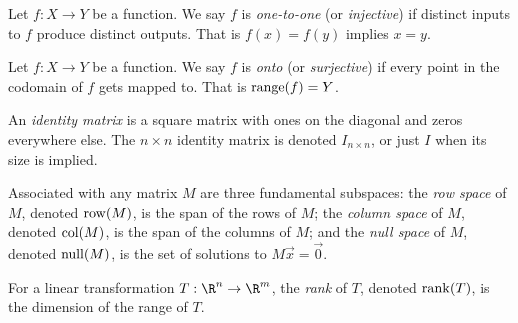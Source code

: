 \begin{SaveDefinition}[
	key=Onetoone,
	title={One-to-one}]
		
	Let $f:X\to Y$ be a function. We say $f$ is \emph{one-to-one} (or \emph{injective}) if
	distinct inputs to $f$ produce distinct outputs. That is $f(x)=f(y)$ implies $x=y$.
\end{SaveDefinition}

\begin{SaveDefinition}[
	key=Onto,
	title={Onto}]
		
	Let $f:X\to Y$ be a function.
	We say $f$ is \emph{onto} (or \emph{surjective}) if every point in the codomain of $f$ gets mapped to.
	That is $\operatorname{range}(f)=Y$.
\end{SaveDefinition}

\begin{SaveDefinition}[
	key=IdentityMatrix,
	title={Identity Matrix}]
	
	An \emph{identity matrix} is a square matrix with ones on the diagonal
	and zeros everywhere else. The $n\times n$ identity matrix is denoted $I_{n\times n}$,
	or just $I$ when its size is implied.
\end{SaveDefinition}

\begin{SaveDefinition}[key=FundamentalSubspaces, title={Fundamental Subspaces}]
	Associated with any matrix $M$ are three fundamental subspaces: the
	\emph{row space} of $M$, denoted $\operatorname{row}(M)$, is the span of the rows of
	$M$; the
	\emph{column space} of $M$, denoted $\operatorname{col}(M)$, is the span of the
	columns of $M$; and the
	\emph{null space} of $M$, denoted $\operatorname{null}(M)$, is the set of solutions to
	$M\vec x=\vec 0$.
\end{SaveDefinition}

\begin{SaveDefinition}[key=RankofaLinearTransformation, title={Rank of a Linear Transformation}]
	For a linear transformation $T:\R^n\to \R^m$, the
	\emph{rank} of $T$, denoted $\operatorname{rank}(T)$, is the dimension of the range of
	$T$.
\end{SaveDefinition}

